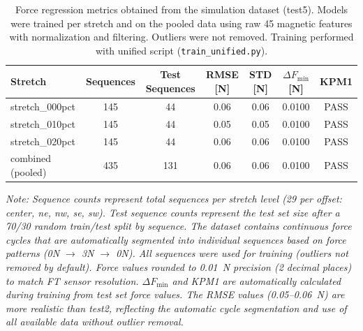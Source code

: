 \documentclass[11pt,a4paper]{article}
\begin{document}
\begin{table}[H]
    \centering
    \caption{Force regression metrics obtained from the simulation dataset (test5). Models were trained per stretch
             and on the pooled data using raw 45 magnetic features with normalization and filtering. Outliers were not removed.
             Training performed with unified script (\texttt{train\_unified.py}).}
    \label{tab:sim-force-test5}
    \begin{tabular}{@{}lcccccc@{}}
        \toprule
        Stretch & Sequences & Test Sequences & RMSE [N] & STD [N] & $\Delta F_{\text{min}}$ [N] & KPM1 \\
        \midrule
        stretch\_000pct & 145 & 44 & 0.06 & 0.06 & 0.0100 & PASS \\
        stretch\_010pct & 145 & 44 & 0.05 & 0.05 & 0.0100 & PASS \\
        stretch\_020pct & 145 & 44 & 0.06 & 0.06 & 0.0100 & PASS \\
        combined (pooled) & 435 & 131 & 0.06 & 0.06 & 0.0100 & PASS \\
        \bottomrule
    \end{tabular}
    \vspace{0.1cm}
    \footnotesize
    \textit{Note: Sequence counts represent total sequences per stretch level (29 per offset: center, ne, nw, se, sw). Test sequence counts represent the test set size after a 70/30 random train/test split by sequence. The dataset contains continuous force cycles that are automatically segmented into individual sequences based on force patterns (0N $\rightarrow$ 3N $\rightarrow$ 0N). All sequences were used for training (outliers not removed by default). Force values rounded to 0.01~N precision (2 decimal places) to match FT sensor resolution. $\Delta F_{\text{min}}$ and KPM1 are automatically calculated during training from test set force values. The RMSE values (0.05--0.06~N) are more realistic than test2, reflecting the automatic cycle segmentation and use of all available data without outlier removal.}
\end{table}
\end{document}
